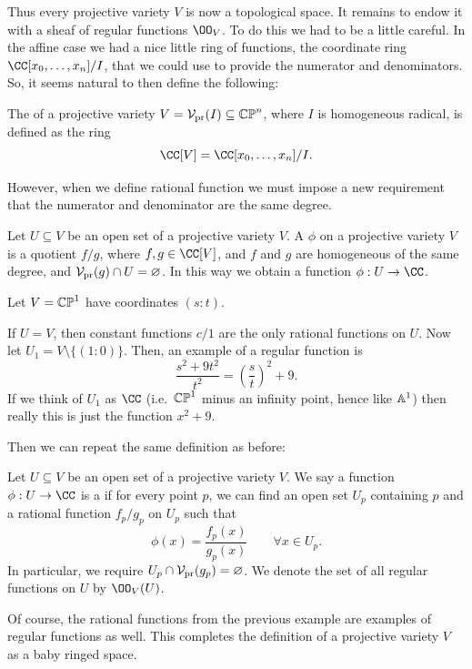 Thus every projective variety $V$ is now a topological space.
It remains to endow it with a sheaf of regular functions $\OO_V$.
To do this we had to be a little careful.
In the affine case we had a nice little ring of functions,
the coordinate ring $\CC[x_0,\dots,x_n] / I$,
that we could use to provide the numerator and denominators.
So, it seems natural to then define the following:
\begin{definition}
	The  of a projective variety
	$V = \mathcal V_{\text{pr}}(I) \subseteq \mathbb{CP}^n$, where $I$ is homogeneous radical,
	is defined as the ring
	\[ \CC[V] = \CC[x_0, \dots, x_n] / I. \]
\end{definition}
However, when we define rational function we must impose
a new requirement that the numerator and denominator are the same degree.
\begin{definition}
	Let $U \subseteq V$ be an open set of a projective variety $V$.
	A  $\phi$ on a projective variety $V$
	is a quotient $f/g$, where $f,g \in \CC[V]$,
	and $f$ and $g$ are homogeneous of the same degree,
	and $\mathcal V_{\text{pr}}(g) \cap U = \varnothing$.
	In this way we obtain a function $\phi : U \to \CC$.
\end{definition}
\begin{example}
	Let $V = \mathbb{CP}^1$ have coordinates $(s:t)$.
	\begin{enumerate}[(a)]
		\ii If $U = V$, then constant functions $c/1$
		are the only rational functions on $U$.
		\ii Now let $U_1 = V \setminus \{(1:0)\}$.
		Then, an example of a regular function is
		\[ \frac{s^2+9t^2}{t^2} = \left( \frac st \right)^2 + 9. \]
		If we think of $U_1$ as $\CC$
		(i.e.\ $\mathbb{CP}^1$ minus an infinity point, hence like $\mathbb A^1$)
		then really this is just the function $x^2+9$.
	\end{enumerate}
\end{example}
Then we can repeat the same definition as before:
\begin{definition}
	Let $U \subseteq V$ be an open set of a projective variety $V$.
	We say a function $\phi : U \to \CC$ is a  if
	for every point $p$, we can find an open set $U_p$ containing $p$
	and a rational function $f_p/g_p$ on $U_p$ such that
	\[ \phi(x) = \frac{f_p(x)}{g_p(x)} \qquad \forall x \in U_p. \]
	In particular, we require $U_p \cap \mathcal V_{\text{pr}}(g_p) = \varnothing$.
	We denote the set of all regular functions on $U$ by $\OO_V(U)$.
\end{definition}
Of course, the rational functions from the previous example
are examples of regular functions as well.
This completes the definition of a projective variety $V$
as a baby ringed space.

